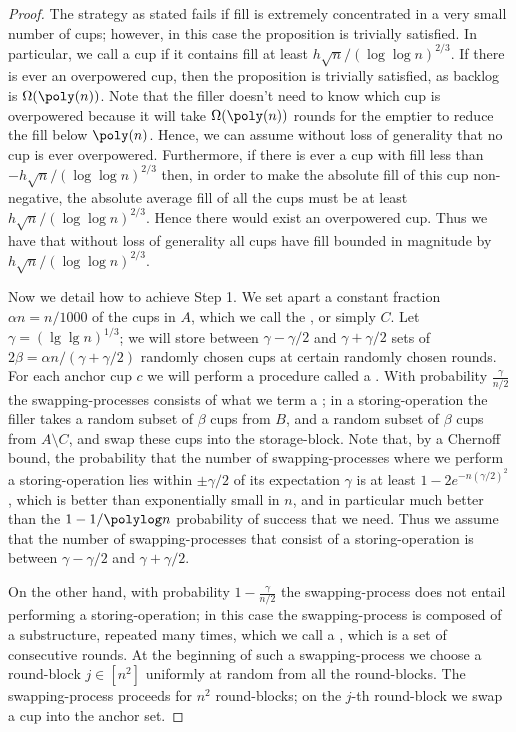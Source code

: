 \begin{proof}
The strategy as stated fails if fill is extremely concentrated in a very small
number of cups; however, in this case the proposition is trivially satisfied.
In particular, we call a cup  if it contains fill at least
$h\sqrt{n}/(\log\log n)^{2/3}$. If there is ever an overpowered cup, then the
proposition is trivially satisfied, as backlog is $\Omega(\poly(n))$. Note that
the filler doesn't need to know which cup is overpowered because it will take
$\Omega(\poly(n))$ rounds for the emptier to reduce the fill below $\poly(n)$.
Hence, we can assume without loss of generality that no cup is ever
overpowered. Furthermore, if there is ever a cup with fill less than
$-h\sqrt{n}/(\log\log n)^{2/3}$ then, in order to make the absolute fill of this cup
non-negative, the absolute average fill of all the cups must be at least
$h\sqrt{n}/(\log\log n)^{2/3}$. Hence there would exist an overpowered cup. Thus we
have that without loss of generality all cups have fill bounded in magnitude by
$h\sqrt{n}/(\log\log n)^{2/3}$.

Now we detail how to achieve Step 1.
We set apart a constant fraction $\alpha n= n/1000$ of the cups in $A$, which
we call the , or simply $C$. Let $\gamma = (\lg\lg
n)^{1/3}$; we will store between
$\gamma -\gamma/2$ and $\gamma + \gamma/2$ sets of $2\beta = \alpha n / (\gamma +
\gamma/2)$ randomly chosen cups at certain randomly chosen rounds.
For each anchor cup $c$ we will perform a procedure called a . 
With probability $\frac{\gamma}{n/2}$ the swapping-processes consists of what
we term a ; in a storing-operation the filler takes a 
random subset of $\beta$ cups from $B$, and a random subset of $\beta$ cups
from $A \setminus C$, and swap these cups into the storage-block.
Note that, by a Chernoff bound, the probability that the number of
swapping-processes where we perform a storing-operation lies within $\pm
\gamma/2$ of its expectation $\gamma$ is at least $1-2e^{-n(\gamma/2)^2}$,
which is better than exponentially small in $n$, and in particular much
better than the $1-1/\polylog n$ probability of success that we need.
Thus we assume that the number of swapping-processes that consist of a
storing-operation is between $\gamma- \gamma/2$ and $\gamma+\gamma/2$.

On the other hand, with probability $1-\frac{\gamma}{n/2}$ the swapping-process
does not entail performing a storing-operation; in this case the
swapping-process is composed of a substructure, repeated many times, which we
call a , which is a set of consecutive rounds. At the beginning of
such a swapping-process we choose a round-block $j \in [n^2]$ uniformly at
random from all the round-blocks. The swapping-process proceeds for $n^2$
round-blocks; on the $j$-th round-block we swap a cup into the anchor set.


\end{proof}
